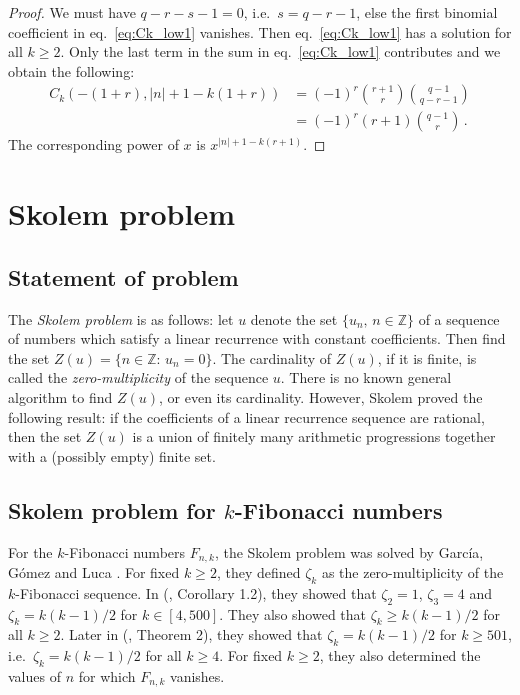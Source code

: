 \documentclass[review]{elsarticle}
\theoremstyle{plain}
\begin{document}
\begin{proof}
We must have $q-r-s-1=0$, i.e.~$s=q-r-1$, else the first binomial coefficient in eq.~\eqref{eq:Ck_low1} vanishes.
Then eq.~\eqref{eq:Ck_low1} has a solution for all $k\ge2$.
Only the last term in the sum in eq.~\eqref{eq:Ck_low1} contributes and we obtain the following:
\begin{equation}
\begin{split}
  C_k(-(1+r),|n|+1-k(1+r)) &= (-1)^r \binom{r+1}{r} \binom{q-1}{q-r-1}
  \\
  &= (-1)^r (r+1) \binom{q-1}{r} \,.
\end{split}
\end{equation}
The corresponding power of $x$ is $x^{|n|+1-k(r+1)}$.
\end{proof}

\setcounter{equation}{0}
\section{Skolem problem}\label{sec:Skolem}
\subsection{Statement of problem}
The \textit{Skolem problem} is as follows:
let $u$ denote the set $\{ u_n,\, n\in\mathbb{Z}\}$ of a sequence of numbers which satisfy a linear recurrence with constant coefficients.
Then find the set $Z(u) = \{n\in\mathbb{Z}:\, u_n=0\}$.
The cardinality of $Z(u)$, if it is finite, is called the \textit{zero-multiplicity} of the sequence $u$.
There is no known general algorithm to find $Z(u)$, or even its cardinality.
However, Skolem \cite{Skolem1933} proved the following result:
if the coefficients of a linear recurrence sequence are rational,
then the set $Z(u)$ is a union of finitely many arithmetic progressions together with a (possibly empty) finite set.

\subsection{Skolem problem for $k$-Fibonacci numbers}
For the $k$-Fibonacci numbers $F_{n,k}$, the Skolem problem was solved by
Garc{\'i}a, G{\'o}mez and Luca \cite{GarciaGomezLuca2020,GarciaGomezLuca2024}.
For fixed $k\ge2$, they defined $\zeta_k$ as the zero-multiplicity of the $k$-Fibonacci sequence.
In (\cite{GarciaGomezLuca2020}, Corollary 1.2), they showed that $\zeta_2=1$, $\zeta_3=4$ and $\zeta_k = k(k-1)/2$ for $k\in[4,500]$.
They also showed that $\zeta_k \ge k(k-1)/2$ for all $k\ge2$.
Later in (\cite{GarciaGomezLuca2024}, Theorem 2), they showed that $\zeta_k = k(k-1)/2$ for $k\ge 501$,
i.e.~$\zeta_k = k(k-1)/2$ for all $k\ge4$.
For fixed $k\ge2$, they also determined the values of $n$ for which $F_{n,k}$ vanishes.
\end{document}
